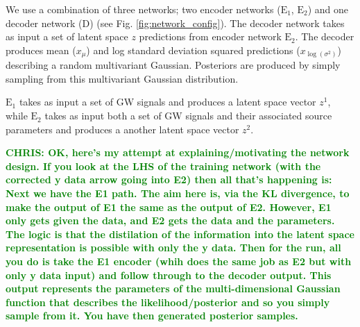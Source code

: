 \documentclass[%
showpacs,
 amsmath,amssymb,
 aps,
 twocolumn,
 prl,
 reprint,
floatfix,
]{revtex4-1}
\newcommand{\chris}[1]{\textbf{\textcolor{green}{CHRIS: #1}}}
\begin{document}

%
%
We use a combination of three networks; two encoder networks ($\textrm{E}_1$, $\textrm{E}_2$) and one
decoder network (D) (see Fig. \ref{fig:network_config}). The decoder network takes as
input a set of latent space $z$ predictions from encoder network $\textrm{E}_2$. 
The decoder produces mean  
($x_{\mu}$) and log standard deviation squared predictions 
($x_{\log{(\sigma^{2})}}$) describing a random multivariant Gaussian. Posteriors are 
produced by simply sampling from this multivariant Gaussian distribution.


$\textrm{E}_1$ takes as 
input a set of \ac{GW} signals and produces a latent space vector $z^1$, while $\textrm{E}_2$ 
takes as input both a set of GW signals and their associated source parameters 
and produces a another latent space vector $z^2$.

\chris{OK, here's my attempt at explaining/motivating the network design. If
you look at the LHS of the training network (with the corrected y data arrow
going into E2) then all that's happening is:
%
Next we have the E1 path. The aim here is, via the KL divergence, to make the
output of E1 the same as the output of E2. However, E1 only gets given the
data, and E2 gets the data and the parameters. The logic is that the
distilation of the information into the latent space representation is possible
with only the y data.
%
Then for the run, all you do is take the E1 encoder (whih does the same job as
E2 but with only y data input) and follow through to the decoder output. This
output represents the parameters of the multi-dimensional Gaussian function
that describes the likelihood/posterior and so you simply sample from it. You
have then generated posterior samples.
}
\end{document}
